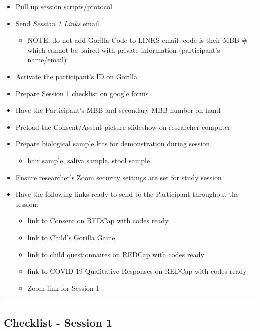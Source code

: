 \documentclass[]{book}
\providecommand{\tightlist}{%
  \setlength{\itemsep}{0pt}\setlength{\parskip}{0pt}}
\begin{document}
\begin{itemize}
\tightlist
\item
  Pull up session scripts/protocol
\item
  Send \emph{Session 1 Links} email

  \begin{itemize}
  \tightlist
  \item
    NOTE: do not add Gorilla Code to LINKS email- code is their MBB \# which cannot be paired with private information (participant's name/email)
  \end{itemize}
\item
  Activate the participant's ID on Gorilla
\item
  Prepare Session 1 checklist on google forms
\item
  Have the Participant's MBB and secondary MBB number on hand
\item
  Preload the Consent/Assent picture slideshow on researcher computer
\item
  Prepare biological sample kits for demonstration during session

  \begin{itemize}
  \tightlist
  \item
    hair sample, saliva sample, stool sample
  \end{itemize}
\item
  Ensure researcher's Zoom security settings are set for study session
\item
  Have the following links ready to send to the Participant throughout the session:

  \begin{itemize}
  \tightlist
  \item
    link to Consent on REDCap with codes ready
  \item
    link to Child's Gorilla Game
  \item
    link to child questionnaires on REDCap with codes ready
  \item
    link to COVID-19 Qualitative Responses on REDCap with codes ready
  \item
    Zoom link for Session 1
  \end{itemize}
\end{itemize}

\begin{center}\rule{0.5\linewidth}{0.5pt}\end{center}

\hypertarget{checklist---session-1}{%
\subsection{Checklist - Session 1}\label{checklist---session-1}}
\end{document}
